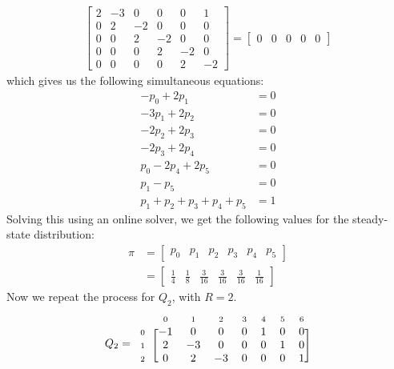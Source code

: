 \documentclass[12pt]{article}
\newcommand{\matindex}[1]{\mbox{\scriptsize#1}}%
\begin{document}
\begin{align*}
\begin{bmatrix}
        2 & -3 & 0 & 0 & 0 & 1  \\
        0 & 2 & -2 & 0 & 0 & 0  \\
        0 & 0 & 2 & -2 & 0 & 0  \\
        0 & 0 & 0 & 2 & -2 & 0 \\
        0 & 0 & 0 & 0 & 2 & -2
    \end{bmatrix} = \begin{bmatrix}
        0 & 0 & 0 & 0 & 0
    \end{bmatrix}
\end{align*} which gives us the following simultaneous equations: \begin{align*}
    -p_{0} + 2 p_{1} &= 0 \\ 
    -3p_{1} + 2 p_{2} &= 0 \\ 
    -2p_{2} + 2 p_{3} &= 0 \\ 
    -2p_{3} + 2 p_{4} &= 0 \\ 
    p_{0}-2p_{4} + 2 p_{5} &= 0 \\ 
    p_{1}-p_{5} &= 0 \\ 
    p_{1}+p_{2}+p_{3}+p_{4}+p_{5} &= 1 
\end{align*} Solving this using an online solver, we get the following values for the steady-state distribution: \begin{align*}
    \pi &= \begin{bmatrix}
        p_{0} & p_{1} & p_{2} & p_{3} & p_{4} & p_{5}
    \end{bmatrix} \\ 
    &= \begin{bmatrix}
        \displaystyle\frac{1}{4} & \displaystyle\frac{1}{8} & \displaystyle\frac{3}{16} & \displaystyle\frac{3}{16} & \displaystyle\frac{3}{16} & \displaystyle\frac{1}{16}
    \end{bmatrix}
\end{align*} Now we repeat the process for $Q_{2}$, with $R = 2$. \begin{equation}
    Q_2 = \begin{blockarray}{cccccccc}
        & \matindex{0} & \matindex{1} & \matindex{2} & \matindex{3} &\matindex{4} &\matindex{5} &\matindex{6}\\
        \begin{block}{c[ccccccc]}
            \matindex{0} & -1 & 0 & 0 & 0 & 1 & 0 & 0 \\ 
            \matindex{1} & 2 & -3 & 0 & 0 & 0 & 1 & 0 \\ 
            \matindex{2} & 0 & 2 & -3 & 0 & 0 & 0 & 1 \\ 

\end{block}
\end{blockarray}
\end{equation}
\end{document}
